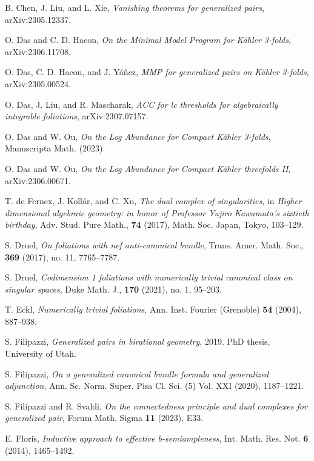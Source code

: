 \documentclass[11pt]{amsart}
\numberwithin{equation}{section}
\theoremstyle{definition}
\theoremstyle{definition}
\theoremstyle{definition}
\begin{document}
\begin{thebibliography}{99}
 B. Chen, J. Liu, and L. Xie, \textit{Vanishing theorems for generalized pairs}, arXiv:2305.12337.

 O. Das and C. D. Hacon, \textit{On the Minimal Model Program for K\"ahler 3-folds}, arXiv:2306.11708.

 O. Das, C. D. Hacon, and J. Y\'a\~nez, \textit{MMP for generalized pairs on K\"ahler 3-folds}, arXiv:2305.00524.

 O. Das, J. Liu, and R. Mascharak, \textit{ACC for lc thresholds for algebraically integrable foliations}, arXiv:2307.07157.

 O. Das and W. Ou, \textit{On the Log Abundance for Compact K\"ahler 3-folds}, Manuscripta Math. (2023)

 O. Das and W. Ou, \textit{On the Log Abundance for Compact K\"ahler threefolds II}, arXiv:2306.00671.

 T. de Fernex, J. Koll\'ar, and C. Xu, \textit{The dual complex of singularities}, in \textit{Higher dimensional algebraic geometry: in honor of Professor Yujiro Kawamata’s sixtieth birthday}, Adv. Stud. Pure Math., \textbf{74} (2017), Math. Soc. Japan, Tokyo, 103--129. 

 S. Druel, \textit{On foliations with nef anti-canonical bundle}, Trans. Amer. Math. Soc., \textbf{369} (2017), no. 11, 7765--7787.

 S. Druel, \textit{Codimension 1 foliations with numerically trivial canonical class on singular spaces}, Duke Math. J., \textbf{170} (2021), no. 1, 95--203.

 T. Eckl, \textit{Numerically trivial foliations}, Ann. Inst. Fourier (Grenoble) \textbf{54} (2004), 887--938.

 S. Filipazzi, \textit{Generalized pairs in birational geometry}, 2019. PhD thesis, University of Utah.

 S. Filipazzi, \textit{On a generalized canonical bundle formula and generalized adjunction}, Ann. Sc. Norm. Super. Pisa Cl. Sci. (5) Vol. XXI (2020), 1187--1221.

 S. Filipazzi and R. Svaldi, \textit{On the connectedness principle and dual complexes for generalized pair}, Forum Math. Sigma \textbf{11} (2023), E33.

 E. Floris, \textit{Inductive approach to effective b-semiampleness}, Int. Math. Res. Not. \textbf{6} (2014), 1465--1492.


\end{thebibliography}
\end{document}
